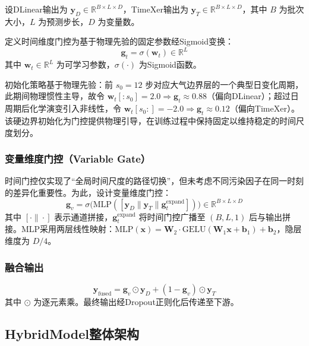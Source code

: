 \documentclass[12pt,a4paper]{article}
\begin{document}
设DLinear输出为 $\mathbf{y}_D \in \mathbb{R}^{B \times L \times D}$，TimeXer输出为 $\mathbf{y}_T \in \mathbb{R}^{B \times L \times D}$，其中 $B$ 为批次大小，$L$ 为预测步长，$D$ 为变量数。

定义时间维度门控为基于物理先验的固定参数经Sigmoid变换：
\begin{equation}
\mathbf{g}_t = \sigma(\mathbf{w}_t) \in \mathbb{R}^{L}
\end{equation}
其中 $\mathbf{w}_t \in \mathbb{R}^{L}$ 为可学习参数，$\sigma(\cdot)$ 为Sigmoid函数。

初始化策略基于物理先验：前 $s_0=12$ 步对应大气边界层的一个典型日变化周期，此期间物理惯性主导，故令 $\mathbf{w}_t[:s_0] = 2.0 \Rightarrow \mathbf{g}_t \approx 0.88$（偏向DLinear）；超过日周期后化学演变引入非线性，令 $\mathbf{w}_t[s_0:] = -2.0 \Rightarrow \mathbf{g}_t \approx 0.12$（偏向TimeXer）。该硬边界初始化为门控提供物理引导，在训练过程中保持固定以维持稳定的时间尺度划分。

\subsubsection{变量维度门控（Variable Gate）}

时间门控仅实现了``全局时间尺度的路径切换''，但未考虑不同污染因子在同一时刻的差异化重要性。为此，设计变量维度门控：
\begin{equation}
\mathbf{g}_v = \sigma\bigl(\text{MLP}([\mathbf{y}_D \| \mathbf{y}_T \| \mathbf{g}_t^{\text{expand}}])\bigr) \in \mathbb{R}^{B \times L \times D}
\end{equation}
其中 $[\cdot\|\cdot]$ 表示通道拼接，$\mathbf{g}_t^{\text{expand}}$ 将时间门控广播至 $(B, L, 1)$ 后与输出拼接。MLP采用两层线性映射：$\text{MLP}(\mathbf{x}) = \mathbf{W}_2 \cdot \text{GELU}(\mathbf{W}_1 \mathbf{x} + \mathbf{b}_1) + \mathbf{b}_2$，隐层维度为 $D/4$。

\subsubsection{融合输出}
\begin{equation}
\mathbf{y}_{\text{fused}} = \mathbf{g}_v \odot \mathbf{y}_D + (1 - \mathbf{g}_v) \odot \mathbf{y}_T
\end{equation}
其中 $\odot$ 为逐元素乘。最终输出经Dropout正则化后传递至下游。

\subsection{HybridModel整体架构}
\end{document}
